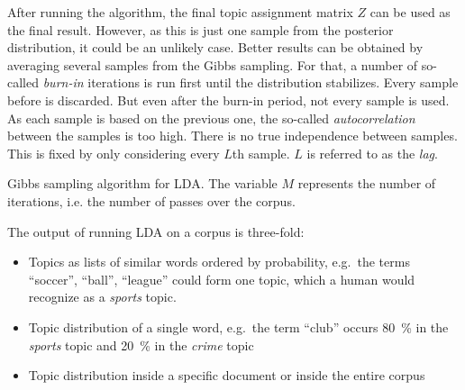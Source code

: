 \documentclass[
        a4paper,
        titlepage,
        twoside,
        parskip,
        numbers=noenddot
        ]{scrbook}
\theoremstyle{break}
\begin{document}
After running the algorithm, the final topic assignment matrix $Z$ can be used as the final result.
However, as this is just one sample from the posterior distribution, it could be an unlikely case.
Better results can be obtained by averaging several samples from the Gibbs sampling.
For that, a number of so-called \emph{burn-in} iterations is run first until the distribution stabilizes.
Every sample before is discarded.
But even after the burn-in period, not every sample is used.
As each sample is based on the previous one, the so-called \emph{autocorrelation} between the samples is too high.
There is no true independence between samples.
This is fixed by only considering every $L$th sample.
$L$ is referred to as the \emph{lag}.

\begin{algorithm}
  \caption{Gibbs sampling algorithm for LDA. The variable $M$ represents the number of iterations, i.e. the number of passes over the corpus.}
  \label{alg:gibbs_sampling}
  \begin{algorithmic}[1]
        \EndFor
      \EndFor
    \EndFor
    \EndProcedure
  \end{algorithmic}
\end{algorithm}
\label{sec:lda}

The output of running LDA on a corpus is three-fold:
\begin{itemize}
  \item Topics as lists of similar words ordered by probability, e.g.\ the terms ``soccer'', ``ball'', ``league'' could form one topic, which a human would recognize as a \emph{sports} topic.
  \item Topic distribution of a single word, e.g.\ the term ``club'' occurs 80~\% in the \emph{sports} topic and 20~\% in the \emph{crime} topic
  \item Topic distribution inside a specific document or inside the entire corpus
\end{itemize}
\end{document}
